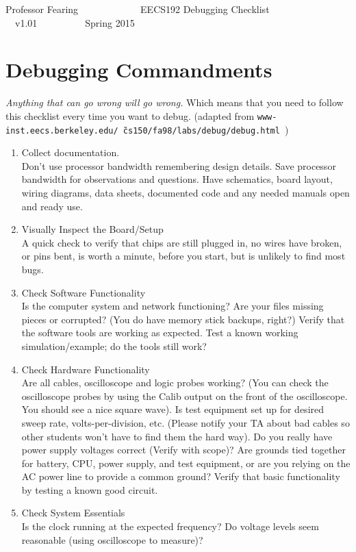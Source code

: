 \documentclass[11pt]{article}
\begin{document}
\thispagestyle{plain}
Professor Fearing~~~~~~~~~~~~~EECS192 Debugging Checklist ~~v1.01~~~~~~~~~~Spring 2015


\section*{\small Debugging Commandments}
{\em Anything that can go wrong will go wrong. }
Which means that you need to follow this checklist every time
you want to debug. (adapted from 
{\tt www-inst.eecs.berkeley.edu/\~\ cs150/fa98/labs/debug/debug.html })

\begin{enumerate}
\item
Collect documentation.\\
Don't use processor bandwidth remembering design details. Save processor 
bandwidth for observations and questions.
Have schematics, board layout, wiring diagrams, data sheets, documented
code and any needed manuals open and ready use.

\item
Visually Inspect the Board/Setup\\
A quick check to verify that chips are still plugged in,
no wires have broken, or pins bent, is worth a minute,
before you start, but is unlikely to find most bugs.
\item
Check Software Functionality\\
Is the computer system and network functioning? Are your
files missing pieces or corrupted? (You do have memory stick backups, right?)
Verify that the software tools are working as expected.
Test a known working simulation/example; do the tools still work?
\item
Check Hardware Functionality\\
Are all cables, oscilloscope and logic probes working?
(You can check the oscilloscope probes by using the Calib output
on the front of the oscilloscope. You should see a nice square wave).
Is test equipment set up for desired sweep rate, volts-per-division,
etc. (Please notify your TA about bad cables so other students
won't have to find them the hard way).
Do you really have power supply voltages correct (Verify with scope)?
Are grounds tied together for battery, CPU, power supply, and test equipment,
or are you relying on the AC power line to provide a common ground?
Verify that basic functionality by testing a known good 
circuit. 

\item
Check System Essentials\\
Is the clock running at the expected frequency?
Do voltage levels seem reasonable (using oscilloscope to measure)?


\end{enumerate}
\end{document}
